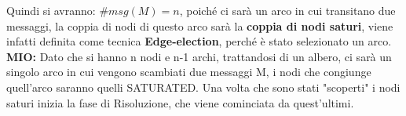 Quindi si avranno: $\#msg(M) = n$, poiché ci sarà un arco in cui transitano due messaggi, la coppia di nodi di questo arco sarà la \textbf{coppia di nodi saturi}, viene infatti definita come tecnica \textbf{Edge-election}, perché è stato selezionato un arco.\\
\textbf{MIO:} Dato che si hanno n nodi e n-1 archi, trattandosi di un albero, ci sarà un singolo arco in cui vengono scambiati due messaggi M, i nodi che congiunge quell'arco saranno quelli SATURATED. Una volta che sono stati "scoperti" i nodi saturi inizia la fase di Risoluzione, che viene cominciata da quest'ultimi.\\
